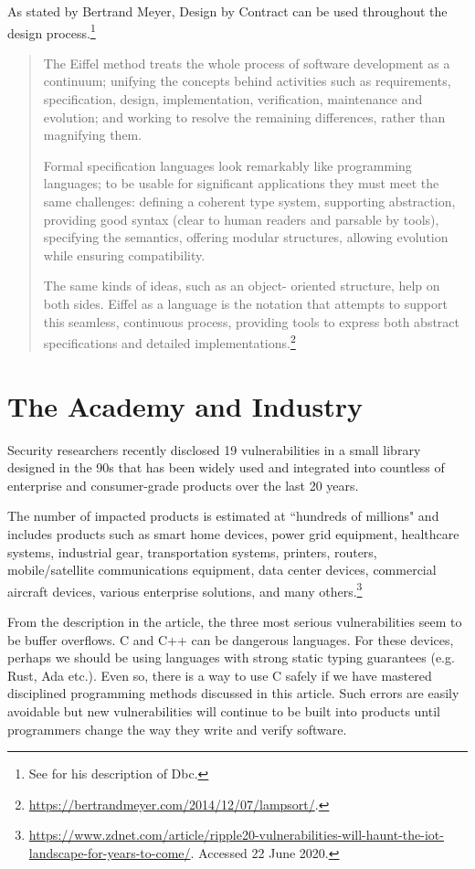 \documentclass[runningheads,12pt]{article}
\begin{document}
As stated by Bertrand Meyer, Design by Contract can be used throughout the design process.\footnote{%
See \cite{Meyer1997a} for his description of Dbc.} 

\begin{quote}
	
The Eiffel method treats the whole process of software development as a continuum; unifying the concepts behind activities such as requirements, specification, design, implementation, verification, maintenance and evolution; and working to resolve the remaining differences, rather than magnifying them.

Formal specification languages look remarkably like programming languages; to be usable for significant applications they must meet the same challenges: defining a coherent type system, supporting abstraction, providing good syntax (clear to human readers and parsable by tools), specifying the semantics, offering modular structures, allowing evolution while ensuring compatibility.

The same kinds of ideas, such as an object- oriented structure, help on both sides. Eiffel as a language is the notation that attempts to support this seamless, continuous process, providing tools to express both abstract specifications and detailed implementations.\footnote{\url{https://bertrandmeyer.com/2014/12/07/lampsort/}.}
\end{quote}


\section{The Academy and Industry}

Security researchers recently disclosed 19 vulnerabilities in a small library designed in the 90s that has been widely used and integrated into countless of enterprise and consumer-grade products over the last 20 years. 

The number of impacted products is estimated at ``hundreds of millions" and includes products such as smart home devices, power grid equipment, healthcare systems, industrial gear, transportation systems, printers, routers, mobile/satellite communications equipment, data center devices, commercial aircraft devices, various enterprise solutions, and many others.\footnote{%
\url{https://www.zdnet.com/article/ripple20-vulnerabilities-will-haunt-the-iot-landscape-for-years-to-come/}. Accessed 22 June 2020.}

From the description in the article, the three most serious vulnerabilities seem to be buffer overflows. C and C++ can be dangerous languages. For these devices, perhaps we should be using languages with strong static typing guarantees (e.g. Rust, Ada etc.). Even so, there is a way to use C safely if we have mastered disciplined programming methods discussed in this article. Such errors are easily avoidable but new vulnerabilities will continue to be built into products until programmers change the way they write and verify software. 
\end{document}
